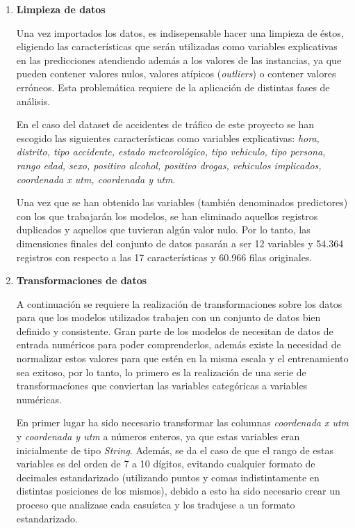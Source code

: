             \begin{enumerate}

                \item \textbf{Limpieza de datos}

                    Una vez importados los datos, es indisepensable hacer una limpieza de éstos, eligiendo las características que serán utilizadas como variables explicativas en las predicciones atendiendo además a los valores de las instancias, ya que pueden contener valores nulos, valores atípicos (\textit{outliers}) o contener valores erróneos. Esta problemática requiere de la aplicación de distintas fases de análisis.

                    En el caso del dataset de accidentes de tráfico de este proyecto se han escogido las siguientes características como variables explicativas: \textit{hora, distrito, tipo accidente, estado meteorológico, tipo vehiculo, tipo persona, rango edad, sexo, positivo alcohol, positivo drogas, vehiculos implicados, coordenada x utm, coordenada y utm}.


                    Una vez que se han obtenido las variables (también denominados predictores) con los que trabajarán los modelos, se han eliminado aquellos registros duplicados y aquellos que tuvieran algún valor nulo. Por lo tanto, las dimensiones finales del conjunto de datos pasarán a ser 12 variables y 54.364 registros con respecto a las 17 características y 60.966 filas originales. 

                \item \textbf{Transformaciones de datos}

                    A continuación se requiere la realización de transformaciones sobre los datos para que los modelos utilizados trabajen con un conjunto de datos bien definido y consistente. Gran parte de los modelos de  necesitan de datos de entrada numéricos para poder comprenderlos, además existe la necesidad de normalizar estos valores para que estén en la misma escala y el entrenamiento sea exitoso, por lo tanto, lo primero es la realización de una serie de transformacíones que conviertan las variables categóricas a variables numéricas.

                    En primer lugar ha sido necesario transformar las columnas \textit{coordenada x utm} y \textit{coordenada y utm} a números enteros, ya que estas variables eran inicialmente de tipo \textit{String}. Además, se da el caso de que el rango de estas variables es del orden de 7 a 10 dígitos, evitando cualquier formato de decimales estandarizado (utilizando puntos y comas indistintamente en distintas posiciones de los mismos), debido a esto ha sido necesario crear un proceso que analizase cada casuístca y los tradujese a un formato estandarizado.


\end{enumerate}
